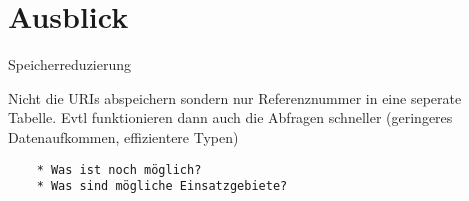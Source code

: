 \chapter{Ausblick}


Speicherreduzierung

Nicht die URIs abspeichern sondern nur Referenznummer in eine seperate Tabelle. Evtl funktionieren dann auch die Abfragen schneller (geringeres Datenaufkommen, effizientere Typen)


\begin{verbatim}
    * Was ist noch möglich?
    * Was sind mögliche Einsatzgebiete? 
\end{verbatim}
